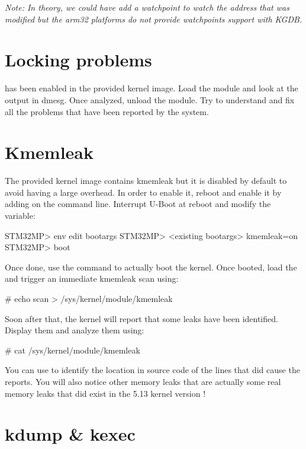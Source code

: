 {\em Note: In theory, we could have add a watchpoint to watch the address that
was modified but the arm32 platforms do not provide watchpoints support with
KGDB.}

\section{Locking problems}

 has been enabled in the provided kernel image.
Load the  module and look at the output in dmesg. Once
analyzed, unload the module. Try to understand and fix all the problems that
have been reported by the  system.

\section{Kmemleak}

The provided kernel image contains kmemleak but it is disabled by default to
avoid having a large overhead. In order to enable it, reboot and enable it by
adding  on the command line. Interrupt U-Boot at reboot and
modify the  variable:

\begin{bashinput}
STM32MP> env edit bootargs
STM32MP> <existing bootargs> kmemleak=on
STM32MP> boot
\end{bashinput}

Once done, use the  command to actually boot the kernel. Once booted,
load the  and trigger an immediate kmemleak scan using:

\begin{bashinput}
# echo scan > /sys/kernel/module/kmemleak
\end{bashinput}

Soon after that, the kernel will report that some leaks have been identified.
Display them and analyze them using:

\begin{bashinput}
# cat /sys/kernel/module/kmemleak
\end{bashinput}

You can use  to identify the location in source code of the
lines that did cause the reports. You will also notice other memory leaks that
are actually some real memory leaks that did exist in the 5.13 kernel version !


\section{kdump \& kexec}

